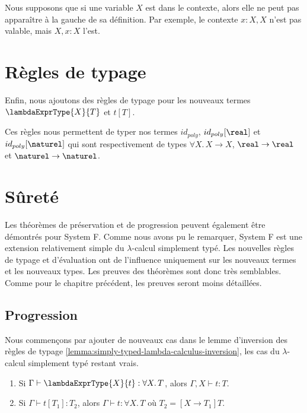 Nous supposons que si une variable $X$ est dans le contexte, alors elle ne peut
pas apparaître à la gauche de sa définition. Par exemple, le contexte $x : X, X$
n'est pas valable, mais $X, x : X$ l'est.

\section{Règles de typage}

Enfin, nous ajoutons des règles de typage pour les nouveaux termes
$\lambdaExprType{X}{T}$ et $t[T]$.


Ces règles nous permettent de typer nos termes $id_{poly}$, $id_{poly}[\real]$ et
$id_{poly}[\naturel]$ qui sont respectivement de types $\forall X . \, X
\rightarrow X$, $\real \rightarrow \real$ et $\naturel \rightarrow \naturel$.

\section{Sûreté}

Les théorèmes de préservation et de progression peuvent également être démontrés
pour System F. Comme nous avons pu le remarquer, System F est une extension
relativement simple du $\lambda$-calcul simplement typé. Les nouvelles règles de typage
et d'évaluation ont de l'influence uniquement sur les nouveaux termes et les
nouveaux types. Les preuves des théorèmes sont donc très semblables. Comme pour
le chapitre précédent, les preuves seront moins détaillées.

\subsection*{Progression}

Nous commençons par ajouter de nouveaux cas dans le lemme d'inversion des règles
de typage \ref{lemma:simply-typed-lambda-calculus-inversion}, les cas du
$\lambda$-calcul simplement typé restant vrais.

\begin{lemma} 
  \begin{enumerate}
    \item Si $\Gamma \vdash \lambdaExprType{X}{t} : \forall X . \, T$, alors
      $\Gamma, X \vdash t : T$.
    \item Si $\Gamma \vdash t[T_{1}] : T_{2}$, alors $\Gamma \vdash t : \forall X .
      \, T$ où $T_{2} = [X \rightarrow T_{1}] T$.
  \end{enumerate}
\end{lemma}
  
